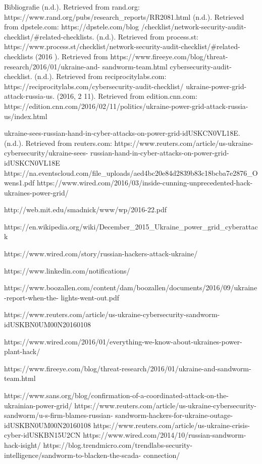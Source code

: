 Bibliografie
(n.d.). Retrieved from rand.org: https://www.rand.org/pubs/research_reports/RR2081.html
(n.d.). Retrieved from dpstele.com: https://dpstele.com/blog%
/checklist/network-security-audit-checklist/#related-checklists. (n.d.). Retrieved from process.st:
https://www.process.st/checklist/network-security-audit-checklist/#related-checklists
(2016 ). Retrieved from https://www.fireeye.com/blog/threat-research/2016/01/ukraine-and-
sandworm-team.html
cybersecurity-audit-checklist. (n.d.). Retrieved from reciprocitylabs.com:
https://reciprocitylabs.com/cybersecurity-audit-checklist/
ukraine-power-grid-attack-russia-us. (2016, 2 11). Retrieved from edition.cnn.com:
https://edition.cnn.com/2016/02/11/politics/ukraine-power-grid-attack-russia-us/index.html

ukraine-sees-russian-hand-in-cyber-attacks-on-power-grid-idUSKCN0VL18E. (n.d.). Retrieved from
reuters.com: https://www.reuters.com/article/us-ukraine-cybersecurity/ukraine-sees-
russian-hand-in-cyber-attacks-on-power-grid-idUSKCN0VL18E
https://na.eventscloud.com/file_uploads/aed4bc20e84d2839b83c18bcba7e2876_Owens1.pdf
https://www.wired.com/2016/03/inside-cunning-unprecedented-hack-ukraines-power-grid/

http://web.mit.edu/smadnick/www/wp/2016-22.pdf

https://en.wikipedia.org/wiki/December_2015_Ukraine_power_grid_cyberattack

https://www.wired.com/story/russian-hackers-attack-ukraine/

https://www.linkedin.com/notifications/

https://www.boozallen.com/content/dam/boozallen/documents/2016/09/ukraine-report-when-the-
lights-went-out.pdf

https://www.reuters.com/article/us-ukraine-cybersecurity-sandworm-idUSKBN0UM00N20160108

https://www.wired.com/2016/01/everything-we-know-about-ukraines-power-plant-hack/

https://www.fireeye.com/blog/threat-research/2016/01/ukraine-and-sandworm-team.html

https://www.sans.org/blog/confirmation-of-a-coordinated-attack-on-the-ukrainian-power-grid/
https://www.reuters.com/article/us-ukraine-cybersecurity-sandworm/u-s-firm-blames-russian-
sandworm-hackers-for-ukraine-outage-idUSKBN0UM00N20160108
https://www.reuters.com/article/us-ukraine-crisis-cyber-idUSKBN15U2CN
https://www.wired.com/2014/10/russian-sandworm-hack-isight/
https://blog.trendmicro.com/trendlabs-security-intelligence/sandworm-to-blacken-the-scada-
connection/

